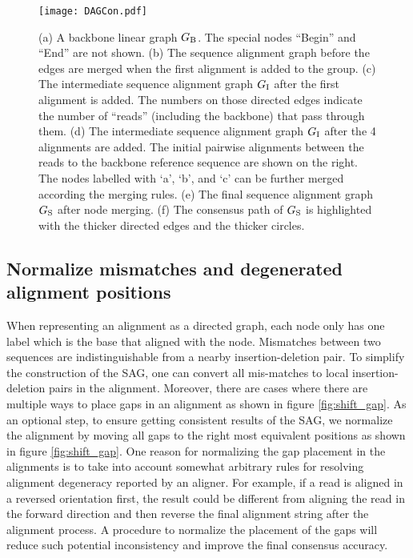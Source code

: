 \documentclass[11pt]{article}
\begin{document}
\begin{figure}

\centering
\texttt{[image: DAGCon.pdf]}
\caption{(a) A backbone linear graph $G_{\rm B}$. The special nodes ``Begin'' and ``End'' are not shown.
         (b) The sequence alignment graph before the edges are merged when the first alignment is added to the group.
         (c) The intermediate sequence alignment graph $G_{\rm I}$ after the first alignment is added. The numbers on those directed edges indicate the number of ``reads'' (including the backbone) that pass through them.
         (d) The intermediate sequence alignment graph $G_{\rm I}$ after the 4 alignments are added. The initial pairwise alignments between the reads to the backbone reference sequence are shown on the right. The nodes labelled with `a', `b', and `c' can be further merged according the merging rules.
         (e) The final sequence alignment graph $G_{\rm S}$ after node merging.
         (f) The consensus path of $G_{\rm S}$ is highlighted with the thicker directed edges and the thicker circles.}
\label{fig:DAGCon}
\end{figure}


\subsection{Normalize mismatches and degenerated alignment positions}

When representing an alignment as a directed graph, each node only has one label which is the base that aligned with the node. Mismatches between two sequences are indistinguishable from a nearby insertion-deletion pair. To simplify the construction of the SAG, one can convert all mis-matches to local insertion-deletion pairs in the alignment. Moreover, there are cases where there are multiple ways to place gaps in an alignment as shown in figure \ref{fig:shift_gap}.  As an optional step, to ensure getting consistent results of the SAG, we normalize the alignment by moving all gaps to the right most equivalent positions as shown in figure \ref{fig:shift_gap}. One reason for normalizing the gap placement in the alignments is to take into account somewhat arbitrary rules for resolving alignment degeneracy reported by an aligner. For example, if a read is aligned in a reversed orientation first, the result could be different from aligning the read in the forward direction and then reverse the final alignment string after the alignment process. A procedure to normalize the placement of the gaps will reduce such potential inconsistency and improve the final consensus accuracy.
\end{document}
